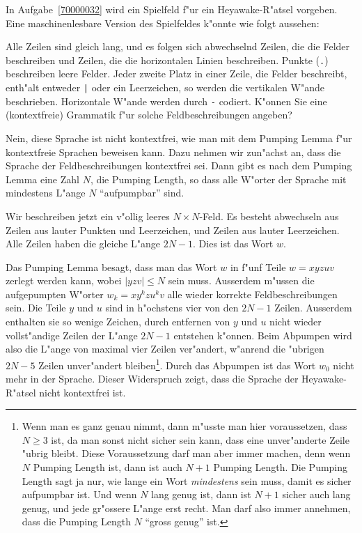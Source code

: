 In Aufgabe~\ref{70000032} wird ein Spielfeld f"ur ein Heyawake-R"atsel vorgeben.
Eine maschinenlesbare Version des Spielfeldes k"onnte wie 
folgt aussehen:
\begin{center}
\small
{}
\end{center}
Alle Zeilen sind gleich lang, und es folgen sich abwechselnd Zeilen,
die die Felder beschreiben und Zeilen, die die horizontalen Linien
beschreiben.
Punkte (\texttt{.}) beschreiben leere Felder.
Jeder zweite Platz in einer Zeile, die Felder beschreibt,
enth"alt entweder \texttt{|} oder ein Leerzeichen, so werden die
vertikalen W"ande beschrieben.
Horizontale W"ande werden durch \texttt{-} codiert.
K"onnen Sie eine (kontextfreie) Grammatik f"ur solche Feldbeschreibungen
angeben?

\begin{loesung}
Nein, diese Sprache ist nicht kontextfrei, wie man mit dem 
Pumping Lemma f"ur kontextfreie Sprachen beweisen kann.
Dazu nehmen wir zun"achst an, dass die Sprache der Feldbeschreibungen
kontextfrei sei. Dann gibt es nach dem Pumping Lemma eine Zahl $N$,
die Pumping Length, so dass alle W"orter der Sprache mit mindestens
L"ange $N$ ``aufpumpbar'' sind.

Wir beschreiben jetzt ein v"ollig leeres $N\times N$-Feld. Es besteht
abwechseln aus Zeilen aus lauter Punkten und Leerzeichen, und Zeilen
aus lauter Leerzeichen. Alle Zeilen haben die gleiche L"ange $2N-1$.
Dies ist das Wort $w$.

Das Pumping Lemma besagt, dass man das Wort  $w$ in f"unf Teile
$w=xyzuv$ zerlegt werden kann, wobei $|yzv|\le N$ sein muss.
Ausserdem m"ussen die aufgepumpten W"orter $w_k=xy^kzu^kv$ alle wieder
korrekte Feldbeschreibungen sein.
Die Teile $y$ und $u$ sind in h"ochstens vier von den $2N-1$ Zeilen.
Ausserdem enthalten sie so wenige Zeichen, durch entfernen von
$y$ und $u$ nicht wieder vollst"andige Zeilen der L"ange $2N-1$ entstehen
k"onnen.
Beim Abpumpen wird also die L"ange von maximal vier Zeilen ver"andert,
w"anrend die "ubrigen $2N-5$ Zeilen unver"andert bleiben\footnote{Wenn man
es ganz genau nimmt, dann m"usste man hier voraussetzen, dass $N \ge 3$ ist,
da man sonst nicht sicher sein kann, dass eine unver"anderte Zeile
"ubrig bleibt. Diese Voraussetzung darf man aber immer machen, denn
wenn $N$ Pumping Length ist, dann ist auch $N+1$ Pumping Length.
Die Pumping Length sagt ja nur, wie lange ein Wort {\em mindestens} sein
muss, damit es sicher aufpumpbar ist. Und wenn $N$ lang genug ist, dann ist
$N+1$ sicher auch lang genug, und jede gr"ossere L"ange erst recht.
Man darf also immer annehmen, dass die Pumping Length $N$ ``gross genug'' ist.}.
Durch das Abpumpen ist das Wort $w_0$ nicht mehr in der Sprache.
Dieser Widerspruch zeigt, dass die Sprache der Heyawake-R"atsel nicht
kontextfrei ist.
\end{loesung}

